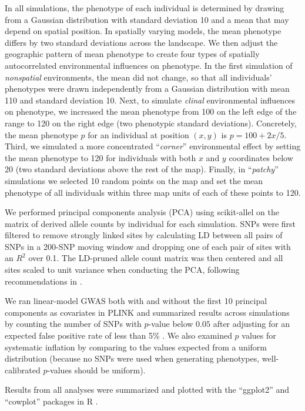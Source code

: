 \documentclass[10pt,twoside,lineno,hidelinks]{preprint}
\begin{document}
In all simulations, the phenotype of each individual
is determined by drawing from a Gaussian distribution with standard deviation 10 
and a mean that may depend on spatial position.
In spatially varying models, the mean phenotype differs by two standard deviations across the landscape.
We then adjust the geographic pattern of mean phenotype to create four types of spatially autocorrelated environmental influences on phenotype.
In the first simulation of \emph{nonspatial} environments, the mean did not change,
so that all individuals' phenotypes were drawn independently from a Gaussian distribution with mean 110 and standard deviation 10.
Next, to simulate \emph{clinal} environmental influences on phenotype, 
we increased the mean phenotype from 100 on the left edge of the range to 120 on the right edge (two phenotypic standard deviations).
Concretely, the mean phenotype $p$ for an individual at position $(x,y)$ is $p=100 + 2x / 5$. 
Third, we simulated a more concentrated ``\emph{corner}'' environmental effect by setting the mean phenotype to 120
for individuals with both $x$ and $y$ coordinates below 20 (two standard deviations above the rest of the map). 
Finally, in ``\emph{patchy}'' simulations we selected 10 random points on the map
and set the mean phenotype of all individuals within three map units of each of these points
to 120.

We performed principal components analysis (PCA) using scikit-allel \citep{Miles2017} on the matrix of derived allele counts by individual for each simulation. 
SNPs were first filtered to remove strongly linked sites by calculating LD between all pairs of SNPs in a 200-SNP moving window and dropping one of each pair of sites with an $R^2$ over 0.1. The LD-pruned allele count matrix was then centered and all sites scaled to unit variance when conducting the PCA, following recommendations in \citet{Patterson2006}.   

We ran linear-model GWAS both with and without the first 10 principal components as covariates in PLINK and summarized results across simulations by counting the number of SNPs 
with $p$-value below $0.05$ after adjusting for an expected false positive rate of less than 5\% \citep{benjamini2001control}. 
We also examined $p$ values for systematic inflation 
by comparing to the values expected from a uniform distribution
(because no SNPs were used when generating phenotypes, well-calibrated $p$-values should be uniform).

Results from all analyses were summarized and plotted with the ``ggplot2'' \citep{Wickham2016} and ``cowplot'' \citep{Wilke2019} packages in R \citep{Rcore2018}. 
\end{document}
